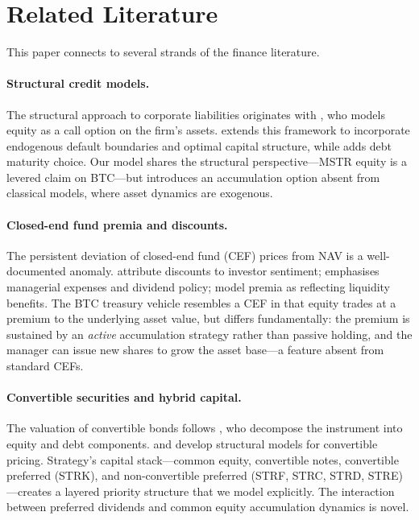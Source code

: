 
\section{Related Literature}\label{sec:literature}

This paper connects to several strands of the finance literature.

\paragraph{Structural credit models.}
The structural approach to corporate liabilities originates with
\citet{merton1974pricing}, who models equity as a call option on the firm's
assets.  \citet{leland1994corporate} extends this framework to incorporate
endogenous default boundaries and optimal capital structure, while
\citet{leland1996optimal} adds debt maturity choice.  Our model shares the
structural perspective---MSTR equity is a levered claim on BTC---but
introduces an accumulation option absent from classical models, where asset
dynamics are exogenous.

\paragraph{Closed-end fund premia and discounts.}
The persistent deviation of closed-end fund (CEF) prices from NAV is a
well-documented anomaly.  \citet{lee1991investor} attribute discounts to
investor sentiment; \citet{pontiff1995closed} emphasises managerial expenses
and dividend policy; \citet{cherkes2009closed} model premia as reflecting
liquidity benefits.  The BTC treasury vehicle resembles a CEF in that equity
trades at a premium to the underlying asset value, but differs fundamentally:
the premium is sustained by an \emph{active} accumulation strategy rather
than passive holding, and the manager can issue new shares to grow the asset
base---a feature absent from standard CEFs.

\paragraph{Convertible securities and hybrid capital.}
The valuation of convertible bonds follows \citet{tsiveriotis1998valuing},
who decompose the instrument into equity and debt components.
\citet{brennan1977convertible} and \citet{ingersoll1977contingent} develop
structural models for convertible pricing.  Strategy's capital stack---common
equity, convertible notes, convertible preferred (STRK), and
non-convertible preferred (STRF, STRC, STRD, STRE)---creates a layered
priority structure that we model explicitly.  The interaction between
preferred dividends and common equity accumulation dynamics is novel.

